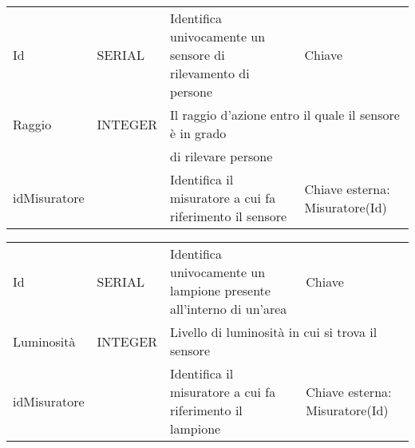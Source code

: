 \begin{center}
    \begin{tabularx}{\textwidth}{|l|l|l|X|}
        \hline
        \rowcolor{gray!30}
        \multicolumn{4}{|c|}{\textbf{SENSORE}}\\
        \hline
        Id & SERIAL & Identifica univocamente un sensore di rilevamento di persone & Chiave\\
        \hline
        Raggio & INTEGER & \multicolumn{2}{l|}{Il raggio d'azione entro il quale il sensore è in grado} \\ & & \multicolumn{2}{l|}{di rilevare persone} \\
        \hline
        idMisuratore & & Identifica il misuratore a cui fa riferimento il sensore & Chiave esterna: Misuratore(Id)\\
        \hline
    \end{tabularx}
\end{center}

\begin{center}
    \begin{tabularx}{\textwidth}{|l|l|l|X|}
        \hline
        \rowcolor{gray!30}
        \multicolumn{4}{|c|}{\textbf{LAMPIONE}}\\
        \hline
        Id & SERIAL & Identifica univocamente un lampione presente all'interno di un'area & Chiave\\
        \hline
        Luminosità & INTEGER & \multicolumn{2}{l|}{Livello di luminosità in cui si trova il sensore} \\
        \hline
        idMisuratore & & Identifica il misuratore a cui fa riferimento il lampione & Chiave esterna: Misuratore(Id)\\
        \hline
    \end{tabularx}
\end{center}